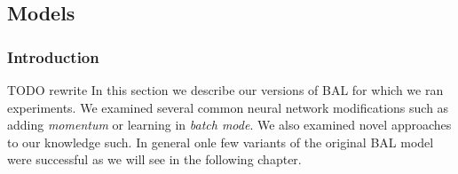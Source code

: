 \subsection{Models}

\subsubsection*{Introduction} 
TODO rewrite  
In this section we describe our versions of BAL for which we ran experiments. We examined several common neural network modifications such as adding \emph{momentum} or learning in \emph{batch mode}. We also examined novel approaches to our knowledge such. In general onle few variants of the original BAL model were successful as we will see in the following chapter. 


 



 
  
 

 

